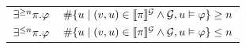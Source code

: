 \begin{table}[t]
\begin{tabular}{cl}
    
    $\exists^{\geq n}\pi.{\varphi}$ & $\#\{u\mid (v,u) \in \llbracket \pi \rrbracket^{\mathcal{G}} \land \mathcal{G},u\vDash\varphi
    \}\geq n$\\[2pt]
    $\exists^{\leq n}\pi.{\varphi}$ & $\#\{u\mid (v,u) \in \llbracket \pi \rrbracket^{\mathcal{G}} \land\mathcal{G},u\vDash\varphi \}\leq n$\\
    \bottomrule
  \end{tabular}
\end{table}




